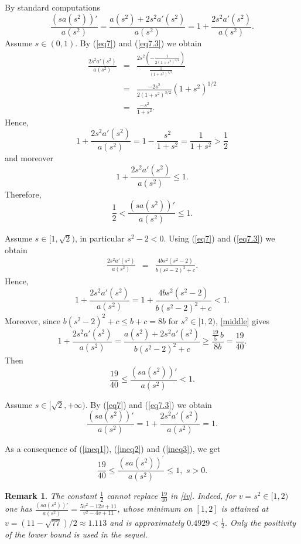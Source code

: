 \documentclass[11pt,leqno]{amsart}
\makeatletter
\newtheorem{remark}[theorem]{Remark}
\renewenvironment{proof}[1][\proofname]{%
  \par
  \pushQED{\qed}%
  \normalfont
  \topsep6\p@\@plus6\p@\relax
  \trivlist
  \item[\hskip\labelsep\itshape #1\@addpunct{.}]%
  \hspace{0.5em}\ignorespaces
}{%
  \popQED
  \endtrivlist\@endpefalse
}
\makeatother
\begin{document}
\begin{proof}
By standard computations
\[
\frac{(sa(s^2))'}{a(s^2)}=\frac{a(s^2)+2s^2a'(s^2)}{a(s^2)}=1+\frac{2s^2a'(s^2)}{a(s^2)}.
\]
Assume $s\in  (0,1)$. By (\ref{eq7}) and (\ref{eq7.3}) we obtain
\[
\begin{array}{rcl}
	\displaystyle\frac{2s^2a'(s^2)}{a(s^2)} &= & \displaystyle\frac{2s^2\left(-\frac{1}{2(1+s^2)^{3/2}}\right)}{\frac{1}{(1+s^2)^{1/2}}} \\
	&= &\displaystyle \frac{-2s^2}{2(1+s^2)^{3/2}}(1+s^2)^{1/2}\\
	&=&\displaystyle \frac{-s^2}{1+s^2}.
\end{array}
\]
Hence,
\[
1+ \displaystyle\frac{2s^2a'(s^2)}{a(s^2)} = 1 - \frac{s^2}{1+s^2}=\frac{1}{1+s^2}>\frac{1}{2}
\]
and moreover
\[
1+ \displaystyle\frac{2s^2a'(s^2)}{a(s^2)} \leq 1.
\]
Therefore,
\begin{equation}\label{ineq1}
	\frac{1}{2}<\frac{(sa(s^2))'}{a(s^2)}\leq 1.
\end{equation}

Assume $s\in  [1,\sqrt{2})$, in particular $s^2-2<0$. Using (\ref{eq7}) and (\ref{eq7.3}) we obtain
\[
\begin{array}{rcl}
	\displaystyle\frac{2s^2a'(s^2)}{a(s^2)} &= & \displaystyle\frac{4bs^2(s^2-2)}{b(s^2-2)^2+c}.
\end{array}
\]
Hence,
\[
1+\displaystyle\frac{2s^2a'(s^2)}{a(s^2)}=1+ \frac{4bs^2(s^2-2)}{b(s^2-2)^2+c}<1.
\]
Moreover, since $b(s^2-2)^2+c\le b+c=8b$ for $s^2\in[1,2)$, \eqref{middle} gives
\[
	1+\displaystyle\frac{2s^2a'(s^2)}{a(s^2)} =  \displaystyle\frac{a(s^2)+ 2s^2a'(s^2)}{b(s^2-2)^2+c}
	\geq  \displaystyle\frac{\frac{19}{5}\,b}{8b}=\frac{19}{40}.
\]
Then
\begin{equation}\label{ineq2}
	\frac{19}{40}\le\frac{(sa(s^2))'}{a(s^2)}< 1.
\end{equation}

Assume $s\in  [\sqrt{2},+\infty)$. By (\ref{eq7}) and (\ref{eq7.3}) we obtain
\begin{equation}\label{ineq3}
	\frac{(sa(s^2))'}{a(s^2)}=1+\displaystyle\frac{2s^2a'(s^2)}{a(s^2)}=1.
\end{equation}

As a consequence of (\ref{ineq1}), (\ref{ineq2}) and (\ref{ineq3}), we get
$$
\frac{19}{40} \leq \frac{(s a(s^2))^{\prime}}{a(s^2)} \leq 1, \,\, s>0.
$$
\end{proof}

\begin{remark}\label{rem:sharp}
The constant $\frac12$ cannot replace $\frac{19}{40}$ in \eqref{iv}. Indeed,
for $v=s^2\in[1,2)$ one has
$\frac{(sa(s^2))'}{a(s^2)}=\frac{5v^2-12v+11}{v^2-4v+11}$, whose minimum
on $[1,2]$ is attained at $v=(11-\sqrt{77})/2\approx1.113$ and is
approximately $0.4929<\frac12$. Only the positivity of the lower bound
is used in the sequel.
\end{remark}
\end{document}
